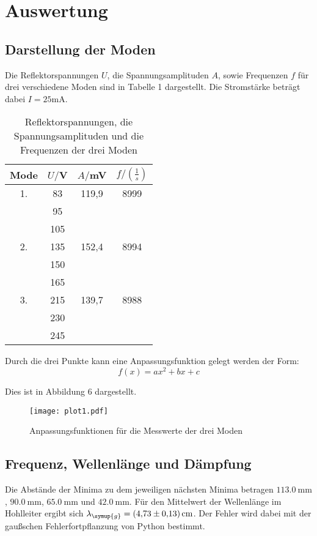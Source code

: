\section{Auswertung}
\label{sec:Auswertung}

\subsection{Darstellung der Moden}
Die Reflektorspannungen $U$, die Spannungsamplituden $A$, sowie Frequenzen $f$ für drei verschiedene Moden sind in Tabelle 1 dargestellt.
Die Stromstärke beträgt dabei $I = 25$mA.



\begin{table}[H]
  \centering
  \caption{Reflektorspannungen, die Spannungsamplituden und die Frequenzen der drei Moden}
  \label{tab:Parameter}
  \begin{tabular}{c c c c}
    \toprule
    Mode & $U/$V & $A/$mV& $f/\left(\frac{1}{s}\right)$\\
    \midrule
    1. & 83  &   119,9& 8999 \\
       & 95  & &       \\
       & 105 & &       \\
    2. & 135 &    152,4 & 8994 \\
       & 150 & & \\
       & 165 & & \\
    3. & 215 &  139,7  & 8988 \\
       & 230 & & \\
       & 245 & & \\
    \bottomrule
  \end{tabular}
\end{table}

Durch die drei Punkte kann eine Anpassungsfunktion gelegt werden der Form:
\begin{equation*}
  f(x)=ax^2+bx+c
\end{equation*}

Dies ist in Abbildung 6 dargestellt.
\begin{figure}
  \centering
  \texttt{[image: plot1.pdf]}
  \caption{Anpassungsfunktionen für die Messwerte der drei Moden}
  \label{fig:plot}
\end{figure}



\subsection{Frequenz, Wellenlänge und Dämpfung}
Die Abstände der Minima zu dem jeweiligen nächsten Minima betragen $\SI{113.0}{\milli\meter}$, $\SI{90.0}{\milli\meter}$,
$\SI{65.0}{\milli\meter}$ und $\SI{42.0}{\milli\meter}$.
Für den Mittelwert der Wellenlänge im Hohlleiter ergibt sich $\lambda_{\symup{g}} =\SI{4.73(13)}{\centi\meter}$.
Der Fehler wird dabei mit der gaußschen Fehlerfortpflanzung von Python bestimmt.

